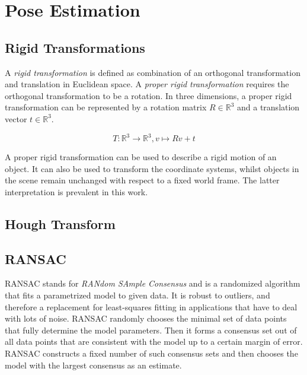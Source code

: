 \section{Pose Estimation}

\subsection{Rigid Transformations}

A {\it rigid transformation} is defined as combination of an orthogonal
transformation and translation in Euclidean space. A {\it proper rigid
transformation} requires the orthogonal transformation to be a rotation. In
three dimensions, a proper rigid transformation can be represented by a
rotation matrix $R \in \mathbb{R}^3$ and a translation vector $t \in
\mathbb{R}^3$.

\begin{equation}
    T: \mathbb{R}^3 \to \mathbb{R}^3, v \mapsto Rv + t
\end{equation}

A proper rigid transformation can be used to describe a rigid motion of an
object. It can also be used to transform the coordinate systems, whilst objects
in the scene remain unchanged with respect to a fixed world frame. The latter
interpretation is prevalent in this work.


\subsection{Hough Transform}

\subsection{RANSAC}

RANSAC stands for {\it RANdom SAmple Consensus} and is a randomized algorithm
that fits a parametrized model to given data. It is robust to outliers, and
therefore a replacement for least-squares fitting in applications that have to
deal with lots of noise. RANSAC randomly chooses the minimal set of data points
that fully determine the model parameters. Then it forms a consensus set out of
all data points that are consistent with the model up to a certain margin of
error. RANSAC constructs a fixed number of such consensus sets and then chooses 
the model with the largest consensus as an estimate.

